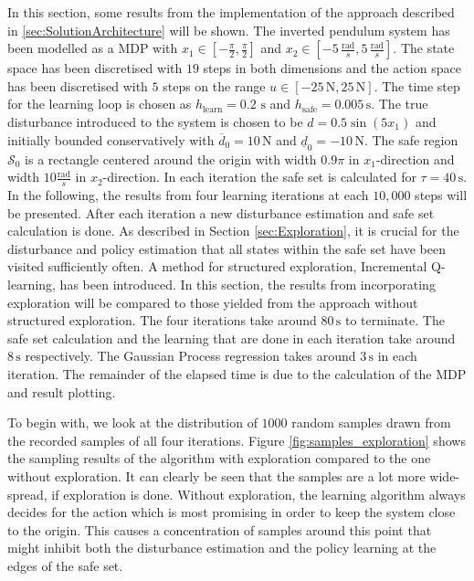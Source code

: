 \documentclass[../main.tex]{subfiles}
\begin{document}
In this section, some results from the implementation of the approach described in \ref{sec:SolutionArchitecture} will be shown. The inverted pendulum system has been modelled as a MDP with $x_1\in [-\frac{\pi}{2}, \frac{\pi}{2}] $ and $x_2 \in [-5\, \frac{\text{rad}}{s},5 \,\frac{\text{rad}}{s}] $. The state space has been discretised with $19$ steps in both dimensions and the action space has been discretised with $5$ steps on the range $u \in [-25\,\text{N},25\,\text{N}] $. The time step for the learning loop is chosen as $h_\text{learn} = 0.2\text{ s}$ and $h_\text{safe} = 0.005\,\text{s}$. The true disturbance introduced to the system is chosen to be $d = 0.5\sin(5x_1)$ and initially bounded conservatively with $\overline{d}_0 = 10 \,\text{N}$ and $\underline{d}_0 = -10 \,\text{N}$. The safe region $\mathcal{S}_0$ is a rectangle centered around the origin with width $0.9\pi$ in $x_1$-direction and width $10\frac{\text{rad}}{s}$ in $x_2$-direction. In each iteration the safe set is calculated for $\tau = 40\,\text{s}$. 
In the following, the results from four learning iterations at each $10,000$ steps will be presented. After each iteration a new disturbance estimation and safe set calculation is done. As described in Section \ref{sec:Exploration}, it is crucial for the disturbance and policy estimation that all states within the safe set have been visited sufficiently often. A method for structured exploration, Incremental Q-learning, has been introduced. In this section, the results from incorporating exploration will be compared to those yielded from the approach without structured exploration. The four iterations take around $80\,\text{s}$ to terminate. The safe set calculation and the learning that are done in each iteration take around $8\,\text{s}$ respectively. The Gaussian Process regression takes around  $3\,\text{s}$ in each iteration. The remainder of the elapsed time is due to the calculation of the MDP and result plotting.


To begin with, we look at the distribution of $1000$ random samples drawn from the recorded samples of all four iterations. Figure \ref{fig:samples_exploration} shows the sampling results of the algorithm with exploration compared to the one without exploration. It can clearly be seen that the samples are a lot more wide-spread, if exploration is done. Without exploration, the learning algorithm always decides for the action which is most promising in order to keep the system close to the origin. This causes a concentration of samples around this point that might inhibit both the disturbance estimation and the policy learning at the edges of the safe set. 
\end{document}
